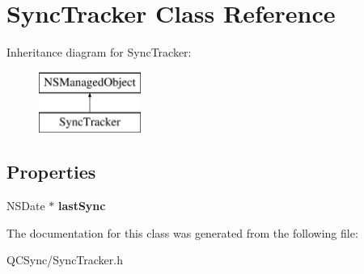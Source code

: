 \hypertarget{interface_sync_tracker}{
\section{SyncTracker Class Reference}
\label{interface_sync_tracker}
}
Inheritance diagram for SyncTracker:\begin{figure}[H]
\begin{center}
\leavevmode
\includegraphics[height=2.000000cm]{interface_sync_tracker}
\end{center}
\end{figure}
\subsection*{Properties}
\begin{DoxyCompactItemize}
\item 
\hypertarget{interface_sync_tracker_a0aeb70bc8dc6b5bb6aa79f9e9fa4ea2c}{
NSDate $\ast$ {\bfseries lastSync}}
\label{interface_sync_tracker_a0aeb70bc8dc6b5bb6aa79f9e9fa4ea2c}

\end{DoxyCompactItemize}


The documentation for this class was generated from the following file:\begin{DoxyCompactItemize}
\item 
QCSync/SyncTracker.h\end{DoxyCompactItemize}
